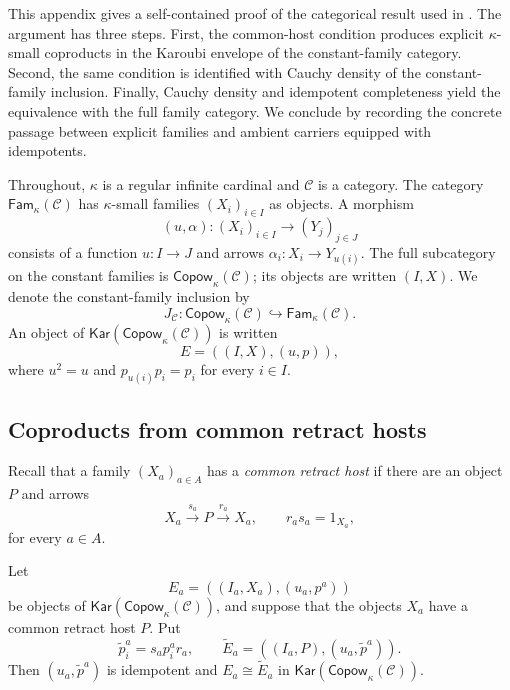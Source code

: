 \documentclass[runningheads,envcountsame]{llncs}
\newcommand{\Copow}{\mathsf{Copow}}
\newcommand{\Fam}{\mathsf{Fam}}
\newcommand{\Kar}{\mathsf{Kar}}
\begin{document}
This appendix gives a self-contained proof of the categorical result used in
.  The argument has three steps.  First, the common-host
condition produces explicit $\kappa$-small coproducts in the Karoubi envelope
of the constant-family category.  Second, the same condition is identified
with Cauchy density of the constant-family inclusion.  Finally, Cauchy density
and idempotent completeness yield the equivalence with the full family
category.  We conclude by recording the concrete passage between explicit
families and ambient carriers equipped with idempotents.

Throughout, $\kappa$ is a regular infinite cardinal and $\mathcal C$ is a
category.  The category $\Fam_\kappa(\mathcal C)$ has $\kappa$-small families
$(X_i)_{i\in I}$ as objects.  A morphism
$$
(u,\alpha):(X_i)_{i\in I}\longrightarrow(Y_j)_{j\in J}
$$
consists of a function $u:I\to J$ and arrows
$\alpha_i:X_i\to Y_{u(i)}$.  The full subcategory on the constant families is
$\Copow_\kappa(\mathcal C)$; its objects are written $(I,X)$.  We denote the
constant-family inclusion by
$$
J_{\mathcal C}:\Copow_\kappa(\mathcal C)
\hookrightarrow\Fam_\kappa(\mathcal C).
$$
An object of $\Kar(\Copow_\kappa(\mathcal C))$ is written
$$
E=((I,X),(u,p)),
$$
where $u^2=u$ and $p_{u(i)}p_i=p_i$ for every $i\in I$.

\subsection{Coproducts from common retract hosts}
\label{app:common-carrier-details}

Recall that a family $(X_a)_{a\in A}$ has a \emph{common retract host} if
there are an object $P$ and arrows
$$
X_a\xrightarrow{s_a}P\xrightarrow{r_a}X_a,
\qquad
r_as_a=1_{X_a},
$$
for every $a\in A$.

\begin{lemma}
\label{lem:common-carrier-app}
Let
$$
E_a=((I_a,X_a),(u_a,p^a))
$$
be objects of $\Kar(\Copow_\kappa(\mathcal C))$, and suppose that the
objects $X_a$ have a common retract host $P$.  Put
$$
\widetilde p^a_i=s_ap^a_ir_a,
\qquad
\widetilde E_a=((I_a,P),(u_a,\widetilde p^a)).
$$
Then $(u_a,\widetilde p^a)$ is idempotent and
$E_a\cong\widetilde E_a$ in
$\Kar(\Copow_\kappa(\mathcal C))$.
\end{lemma}
\end{document}
